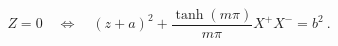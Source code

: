\begin{equation}
  Z=0 \quad \Longleftrightarrow \quad (z+a)^2 + \frac{\tanh(m\pi)}{m\pi}
  X^+X^- = b^2\ .
\end{equation}

